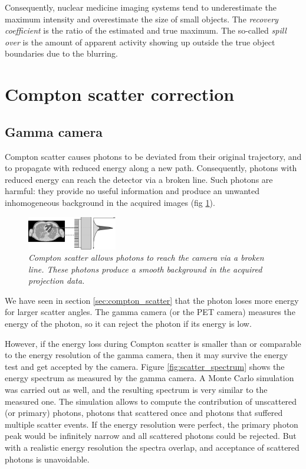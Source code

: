 Consequently, nuclear medicine imaging systems tend to underestimate
the maximum intensity and overestimate the size of small objects. The
{\em recovery coefficient} is the ratio of the estimated and true
maximum. The so-called {\em spill over} is the amount of apparent
activity showing up outside the true object boundaries due to the
blurring.

\section{Compton scatter correction \label{sec:scatter}}
\subsection{Gamma camera \label{sec:spectscatcor}}
Compton scatter causes photons to be deviated from their original trajectory,
and to propagate with reduced energy along a new path. Consequently, photons
with reduced energy can reach the detector via a broken line. Such photons are
harmful: they provide no useful information and produce an unwanted
inhomogeneous background in the acquired images (fig
\ref{fig:scatter_gammacamera}).

\begin{figure}[tb]
\centering
\includegraphics[width=\figone]{figs/fig_scatter_gammacamera.pdf}
\caption{\label{fig:scatter_gammacamera} \emph{Compton scatter allows
photons to reach the camera via a broken line. These photons produce a smooth
background in the acquired projection data.}}
\end{figure}

We have seen in section \ref{sec:compton_scatter} that the photon loses more
energy for larger scatter angles. The gamma camera (or the PET camera) measures
the energy of the photon, so it can reject the photon if its energy is low.

However, if the energy loss during Compton scatter is smaller than or
comparable to the energy resolution of the gamma camera, then it may
survive the energy test and get accepted by the camera. Figure
\ref{fig:scatter_spectrum} shows the energy spectrum as measured by
the gamma camera. A Monte Carlo simulation was carried out as well,
and the resulting spectrum is very similar to the measured one. The
simulation allows to compute the contribution of unscattered (or
primary) photons, photons that scattered once and photons that
suffered multiple scatter events. If the energy resolution were
perfect, the primary photon peak would be infinitely narrow and all
scattered photons could be rejected. But with a realistic energy
resolution the spectra overlap, and acceptance of scattered photons is
unavoidable.

